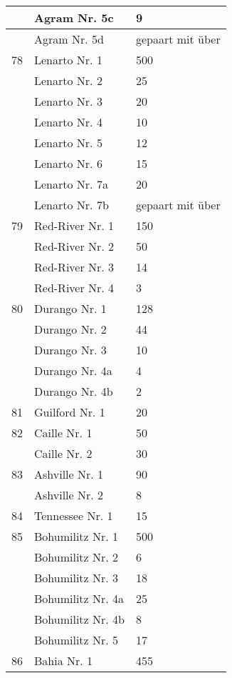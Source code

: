 \documentclass[a4paper, 11pt, oneside, polutonikogreek, german]{article}
\begin{document}
\begin{center}
\begin{longtable}{|l|l|l|}
          & Agram Nr. 5c & 9 \\ \hline
          & Agram Nr. 5d & gepaart mit über \\ \hline
        78 & Lenarto Nr. 1 & 500 \\ \hline
          & Lenarto Nr. 2 & 25 \\ \hline
          & Lenarto Nr. 3 & 20 \\ \hline
          & Lenarto Nr. 4 & 10 \\ \hline
          & Lenarto Nr. 5 & 12 \\ \hline
          & Lenarto Nr. 6 & 15 \\ \hline
          & Lenarto Nr. 7a & 20 \\ \hline
          & Lenarto Nr. 7b & gepaart mit über \\ \hline
        79 & Red-River Nr. 1 & 150 \\ \hline
          & Red-River Nr. 2 & 50 \\ \hline
          & Red-River Nr. 3 & 14 \\ \hline
          & Red-River Nr. 4 & 3 \\ \hline
        80 & Durango Nr. 1 & 128 \\ \hline
          & Durango Nr. 2 & 44 \\ \hline
          & Durango Nr. 3 & 10 \\ \hline
          & Durango Nr. 4a & 4 \\ \hline
          & Durango Nr. 4b & 2 \\ \hline
        81 & Guilford Nr. 1 & 20 \\ \hline
        82 & Caille Nr. 1 & 50 \\ \hline
          & Caille Nr. 2 & 30 \\ \hline
        83 & Ashville Nr. 1 & 90 \\ \hline
          & Ashville Nr. 2 & 8 \\ \hline
        84 & Tennessee Nr. 1 & 15 \\ \hline
        85 & Bohumilitz Nr. 1 & 500 \\ \hline
          & Bohumilitz Nr. 2 & 6 \\ \hline
          & Bohumilitz Nr. 3 & 18 \\ \hline
          & Bohumilitz Nr. 4a & 25 \\ \hline
          & Bohumilitz Nr. 4b & 8 \\ \hline
          & Bohumilitz Nr. 5 & 17 \\ \hline
        86 & Bahia Nr. 1 & 455 \\ \hline

\end{longtable}
\end{center}
\end{document}

